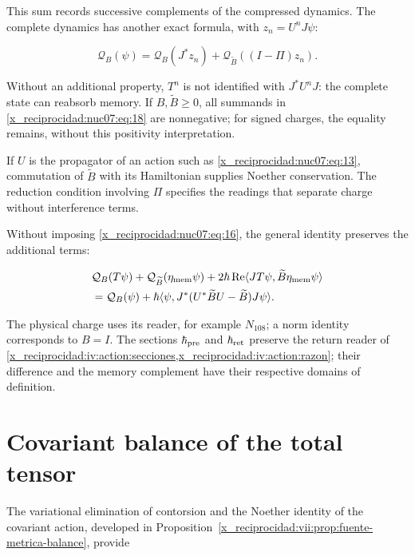 This sum records successive complements of the compressed dynamics. The complete dynamics has another exact formula, with \(z_n=U^nJ\psi\):

\begin{equation}
\mathcal Q_B(\psi)=
\mathcal Q_B(J^*z_n)+
\mathcal Q_{\widetilde B}((I-\Pi)z_n).
\label{x_reciprocidad:nuc07:eq:19}
\end{equation}

Without an additional property, \(T^n\) is not identified with \(J^*U^nJ\): the complete state can reabsorb memory. If \(B,\widetilde B\ge0\), all summands in \eqref{x_reciprocidad:nuc07:eq:18} are nonnegative; for signed charges, the equality remains, without this positivity interpretation.

If \(U\) is the propagator of an action such as \eqref{x_reciprocidad:nuc07:eq:13}, commutation of \(\widetilde B\) with its Hamiltonian supplies Noether conservation. The reduction condition involving \(\Pi\) specifies the readings that separate charge without interference terms.

Without imposing \eqref{x_reciprocidad:nuc07:eq:16}, the general identity preserves the additional terms:

\begin{equation}
\begin{aligned}
&\mathcal Q_B(T\psi)+\mathcal Q_{\widetilde B}(\eta_{\rm mem}\psi)
+2\hbar\operatorname{Re}
\langle JT\psi,\widetilde B\eta_{\rm mem}\psi\rangle\\
&=\mathcal Q_B(\psi)+
\hbar\langle\psi,J^*(U^*\widetilde BU-\widetilde B)J\psi\rangle.
\end{aligned}
\label{x_reciprocidad:nuc07:eq:20}
\end{equation}

The physical charge uses its reader, for example \(N_{108}\); a norm identity corresponds to \(B=I\). The sections \(\hbar_{\rm pre}\) and \(\hbar_{\rm ret}\) preserve the return reader of \cref{x_reciprocidad:iv:action:secciones,x_reciprocidad:iv:action:razon}; their difference and the memory complement have their respective domains of definition.

\section{Covariant balance of the total tensor}

The variational elimination of contorsion and the Noether identity of the covariant action, developed in Proposition~\ref{x_reciprocidad:vii:prop:fuente-metrica-balance}, provide


